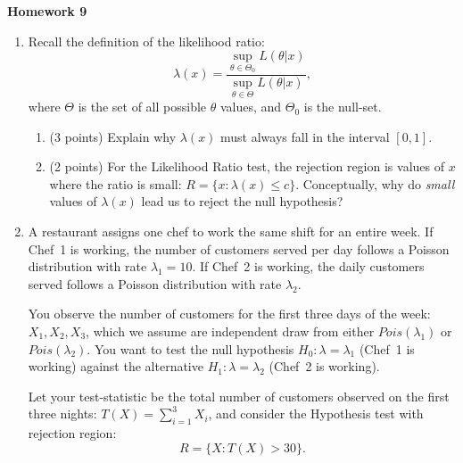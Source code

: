 \documentclass[10pt,twoside]{article}\usepackage[]{graphicx}\usepackage[dvipsnames,svgnames,table]{xcolor}
\begin{document}
\begin{flushright}
\begin{minipage}{.33\textwidth}
\rightline{\today}
\end{minipage}
\end{flushright}

\begin{center}
{\large{\textbf{Homework 9}}}
\end{center}

\begin{enumerate}
  \item Recall the definition of the likelihood ratio:
  $$
  \lambda(x) = \frac{\sup_{\theta \in \Theta_0} L(\theta|x)}{\sup_{\theta \in \Theta} L(\theta|x)},
  $$
  where $\Theta$ is the set of all possible $\theta$ values, and $\Theta_0$ is the null-set.

  \begin{enumerate}
    \item (3 points) Explain why $\lambda(x)$ must always fall in the interval $[0, 1]$.
    \item (2 points) For the Likelihood Ratio test, the rejection region is values of $x$ where the ratio is small: $R = \{x: \lambda(x) \leq c\}$. Conceptually, why do \emph{small} values of $\lambda(x)$ lead us to reject the null hypothesis?
  \end{enumerate}


  \item A restaurant assigns one chef to work the same shift for an entire week. If Chef~1 is working, the number of customers served per day follows a Poisson distribution with rate $\lambda_1 = 10$.
  If Chef~2 is working, the daily customers served follows a Poisson distribution with rate $\lambda_2$.

  You observe the number of customers for the first three days of the week: $X_1, X_2, X_3$, which we assume are independent draw from either $Pois(\lambda_1)$ or $Pois(\lambda_2)$.
  You want to test the null hypothesis $H_0: \lambda = \lambda_1$ (Chef~1 is working) against the alternative $H_1: \lambda = \lambda_2$ (Chef~2 is working).

  Let your test-statistic be the total number of customers observed on the first three nights: $T(X) = \sum_{i = 1}^3 X_i$, and consider the Hypothesis test with rejection region:
  $$
  R = \{X: T(X) > 30\}.
  $$


\end{enumerate}
\end{document}
